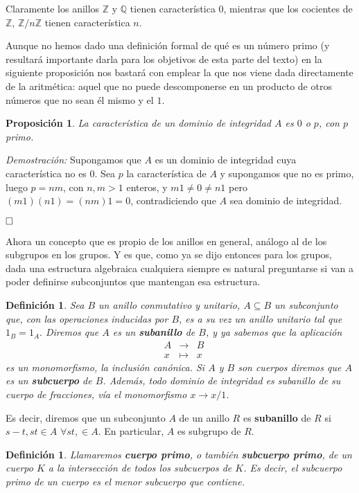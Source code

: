 \documentclass[12pt]{article}
\newtheorem{proposition}[theorem]{Proposición}
\newtheorem{definition}[theorem]{Definición}
\begin{document}
Claramente los anillos $\mathbb{Z}$ y $\mathbb{Q}$ tienen característica $0$, mientras que los cocientes de $\mathbb{Z}$, $\mathbb{Z}/n\mathbb{Z}$ tienen característica $n$. 

Aunque no hemos dado una definición formal de qué es un número primo (y resultará importante darla para los objetivos de esta parte del texto) en la siguiente proposición nos bastará con emplear la que nos viene dada directamente de la aritmética: aquel que no puede descomponerse en un producto de otros números que no sean él mismo y el $1$.

\begin{proposition}La característica de un dominio de integridad $A$ es $0$ o $p$, con $p$ primo.
\end{proposition}
\emph{Demostración: }Supongamos que $A$ es un dominio de integridad cuya característica no es $0$. Sea $p$ la característica de $A$ y supongamos que no es primo, luego $p = nm$, con $n,m>1$ enteros, y $m 1 \neq 0 \neq n  1$ pero $(m 1)(n 1 ) = (n m)1 = 0$, contradiciendo que $A$ sea dominio de integridad.

$\hfill \square$

Ahora un concepto que es propio de los anillos en general, análogo al de los subgrupos en  los grupos. Y es que, como ya se dijo entonces para los grupos, dada una estructura algebraica cualquiera siempre es natural preguntarse si van a poder definirse subconjuntos que mantengan esa estructura. 

\begin{definition} Sea $B$ un anillo conmutativo y unitario, $A \subseteq B$ un subconjunto que, con las operaciones inducidas por $B$, es a su vez un anillo unitario tal que $1_{B} =1_{A}.$ Diremos que $A$ es un \textbf{subanillo} de $B$, y ya sabemos que la aplicación
$$\begin{array}{rccl}
&A&\longrightarrow &B \\
&x& \longmapsto &x
\end{array}
$$  es un monomorfismo, la inclusión canónica. Si $A$ y $B$ son cuerpos diremos que $A$ es un \textbf{subcuerpo} de $B$. Además, todo dominio de integridad es subanillo de su cuerpo de fracciones, vía el monomorfismo $x \longrightarrow x/1$.
\end{definition}

Es decir, diremos que un subconjunto $A$ de un anillo $R$ es \textbf{subanillo} de $R$ si $s-t, st \in A$ $\forall st, \in A$. En particular, $A$ es subgrupo de $R$.

\begin{definition}Llamaremos \textbf{cuerpo primo}, o también \textbf{subcuerpo primo}, de un cuerpo $K$ a la intersección de todos los subcuerpos de $K$. Es decir, el subcuerpo primo de un cuerpo es el menor subcuerpo que contiene.
\end{definition}
\end{document}
